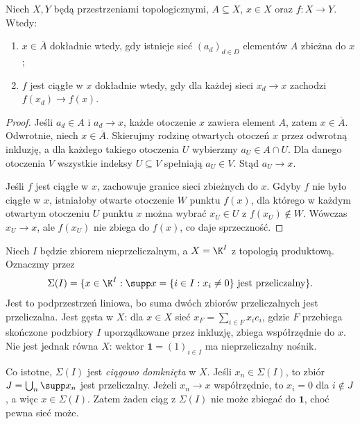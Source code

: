 \begin{twierdzenie}\label{thm:nets-topology}
Niech $X,Y$ będą przestrzeniami topologicznymi, $A\subseteq X$,
$x\in X$ oraz $f:X\to Y$. Wtedy:
\begin{enumerate}[label=\textup{(\roman*)}]
\item $x\in\overline A$ dokładnie wtedy, gdy istnieje sieć
      $(a_d)_{d\in D}$ elementów $A$ zbieżna do $x$;
\item $f$ jest ciągłe w $x$ dokładnie wtedy, gdy dla każdej sieci
      $x_d\to x$ zachodzi $f(x_d)\to f(x)$.
\end{enumerate}
\end{twierdzenie}
\begin{proof}
Jeśli $a_d\in A$ i $a_d\to x$, każde otoczenie $x$ zawiera element $A$,
zatem $x\in\overline A$. Odwrotnie, niech $x\in\overline A$.
Skierujmy rodzinę otwartych otoczeń $x$ przez odwrotną inkluzję,
a dla każdego takiego otoczenia $U$ wybierzmy $a_U\in A\cap U$.
Dla danego otoczenia $V$ wszystkie indeksy $U\subseteq V$
spełniają $a_U\in V$. Stąd $a_U\to x$.

Jeśli $f$ jest ciągłe w $x$, zachowuje granice sieci zbieżnych do $x$.
Gdyby $f$ nie było ciągłe w $x$, istniałoby otwarte otoczenie $W$
punktu $f(x)$, dla którego w każdym otwartym otoczeniu $U$ punktu $x$
można wybrać $x_U\in U$ z $f(x_U)\notin W$. Wówczas $x_U\to x$,
ale $f(x_U)$ nie zbiega do $f(x)$, co daje sprzeczność.
\end{proof}

\begin{przyklad}\label{ex:sigma-net}
Niech $I$ będzie zbiorem nieprzeliczalnym, a
$X=\K^I$ z topologią produktową. Oznaczmy przez
\[
 \Sigma(I)=\{x\in\K^I:\supp x=\{i\in I:x_i\ne0\}
                 \text{ jest przeliczalny}\}.
\]
Jest to podprzestrzeń liniowa, bo suma dwóch zbiorów przeliczalnych
jest przeliczalna. Jest gęsta w $X$: dla $x\in X$ sieć
$x_F=\sum_{i\in F}x_i e_i$, gdzie $F$ przebiega skończone podzbiory
$I$ uporządkowane przez inkluzję, zbiega współrzędnie do $x$.
Nie jest jednak równa $X$: wektor $\mathbf1=(1)_{i\in I}$
ma nieprzeliczalny nośnik.

Co istotne, $\Sigma(I)$ jest \emph{ciągowo domknięta} w $X$.
Jeśli $x_n\in\Sigma(I)$, to zbiór $J=\bigcup_n\supp x_n$
jest przeliczalny. Jeżeli $x_n\to x$ współrzędnie, to $x_i=0$
dla $i\notin J$, a więc $x\in\Sigma(I)$. Zatem żaden ciąg
z $\Sigma(I)$ nie może zbiegać do $\mathbf1$, choć pewna sieć może.
\end{przyklad}

